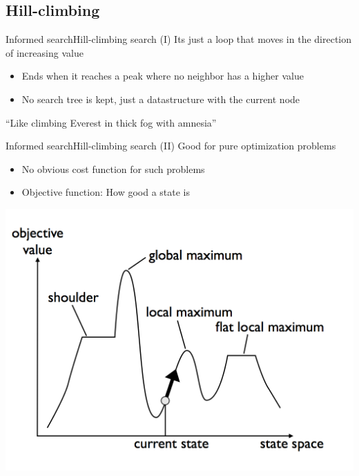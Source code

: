 \documentclass[10pt,compress]{beamer} %
\begin{document}
\subsection{Hill-climbing}

\begin{frame}{Informed search}{Hill-climbing search (I)}
    Its just a loop that moves in the direction of increasing value
      \begin{itemize}
        \item Ends when it reaches a peak where no neighbor has a higher value
        \item No search tree is kept, just a datastructure with the current node
      \end{itemize}
    ``Like climbing Everest in thick fog with amnesia''
\end{frame}

\begin{frame}{Informed search}{Hill-climbing search (II)}
    Good for pure optimization problems
      \begin{itemize}
        \item No obvious cost function for such problems
        \item \alert{Objective function}: How good a state is
      \end{itemize}

     \begin{center}
        \includegraphics[width=0.7\linewidth]{figs/landscape.png}
    \end{center}
\end{frame}
\end{document}
